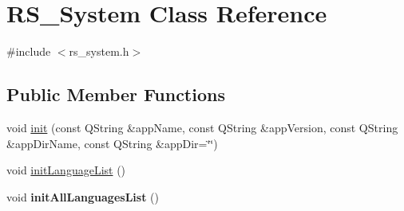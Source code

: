 \hypertarget{classRS__System}{\section{R\-S\-\_\-\-System Class Reference}
\label{classRS__System}
}


{\ttfamily \#include $<$rs\-\_\-system.\-h$>$}

\subsection*{Public Member Functions}
\begin{DoxyCompactItemize}
\item 
void \hyperlink{classRS__System_aace7d6702555aa2174c0372470f007f9}{init} (const Q\-String \&app\-Name, const Q\-String \&app\-Version, const Q\-String \&app\-Dir\-Name, const Q\-String \&app\-Dir=\char`\"{}\char`\"{})
\item 
void \hyperlink{classRS__System_a407398c6097ecc13b26b420db301cc97}{init\-Language\-List} ()
\item 
\hypertarget{classRS__System_ac1d10d7d6ba941657c6081dc4963335f}{void {\bfseries init\-All\-Languages\-List} ()}\label{classRS__System_ac1d10d7d6ba941657c6081dc4963335f}


\end{DoxyCompactItemize}
